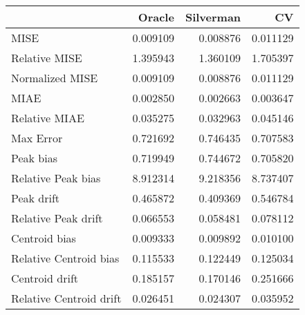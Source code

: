 \begin{tabular}{lrrr}
  \hline
 & Oracle & Silverman & CV \\ 
  \hline
MISE & 0.009109 & 0.008876 & 0.011129 \\ 
  Relative MISE & 1.395943 & 1.360109 & 1.705397 \\ 
  Normalized MISE & 0.009109 & 0.008876 & 0.011129 \\ 
  MIAE & 0.002850 & 0.002663 & 0.003647 \\ 
  Relative MIAE & 0.035275 & 0.032963 & 0.045146 \\ 
  Max Error & 0.721692 & 0.746435 & 0.707583 \\ 
  Peak bias & 0.719949 & 0.744672 & 0.705820 \\ 
  Relative Peak bias & 8.912314 & 9.218356 & 8.737407 \\ 
  Peak drift & 0.465872 & 0.409369 & 0.546784 \\ 
  Relative Peak drift & 0.066553 & 0.058481 & 0.078112 \\ 
  Centroid bias & 0.009333 & 0.009892 & 0.010100 \\ 
  Relative Centroid bias & 0.115533 & 0.122449 & 0.125034 \\ 
  Centroid drift & 0.185157 & 0.170146 & 0.251666 \\ 
  Relative Centroid drift & 0.026451 & 0.024307 & 0.035952 \\ 
   \hline
\end{tabular}
